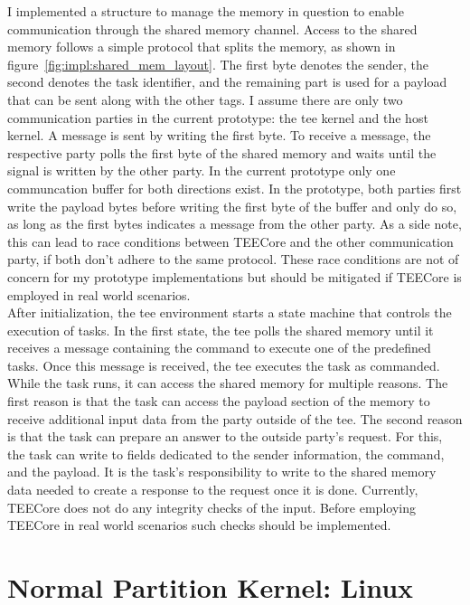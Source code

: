 I implemented a structure to manage the memory in question to enable
communication through the shared memory channel. Access to the shared memory
follows a simple protocol that splits the memory, as shown in
figure~\ref{fig:impl:shared_mem_layout}. The first byte denotes the sender, the
second denotes the task identifier, and the remaining part is used for a payload
that can be sent along with the other tags. I assume there are only two
communication parties in the current prototype: the \gls{tee} kernel and the
host kernel. A message is sent by writing the first byte. To receive a message,
the respective party polls the first byte of the shared memory and waits until
the signal is written by the other party. In the current prototype only one
communcation buffer for both directions exist. In the prototype, both parties
first write the payload bytes before writing the first byte of the buffer and
only do so, as long as the first bytes indicates a message from the other party.
As a side note, this can lead to race conditions between TEECore and the other
communication party, if both don't adhere to the same protocol. These race
conditions are not of concern for my prototype implementations but should be
mitigated if TEECore is employed in real world scenarios.\\

After initialization, the \gls{tee} environment starts a state machine that
controls the execution of tasks. In the first state, the \gls{tee} polls the
shared memory until it receives a message containing the command to execute one
of the predefined tasks. Once this message is received, the \gls{tee} executes
the task as commanded. While the task runs, it can access the shared memory for
multiple reasons. The first reason is that the task can access the payload
section of the memory to receive additional input data from the party outside of
the \gls{tee}. The second reason is that the task can prepare an answer to the
outside party's request. For this, the task can write to fields dedicated to the
sender information, the command, and the payload. It is the task's
responsibility to write to the shared memory data needed to create a response to
the request once it is done. Currently, TEECore does not do any integrity checks
of the input. Before employing TEECore in real world scenarios such checks
should be implemented.

\section{Normal Partition Kernel: Linux}
\label{sec:implementation:hostKernel}

